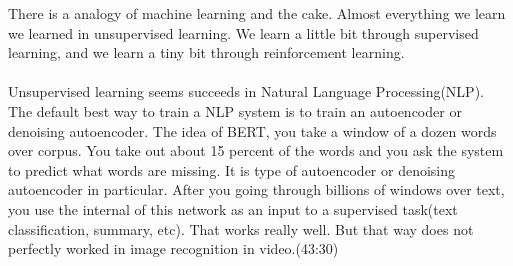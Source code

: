 \documentclass{article}
\begin{document}
There is a analogy of machine learning and the cake. Almost everything we learn we learned in unsupervised learning. We learn a little bit through supervised learning, and we learn a tiny bit through reinforcement learning. \\ \\

Unsupervised learning seems succeeds in Natural Language Processing(NLP). The default best way to train a NLP system is to train an autoencoder or denoising autoencoder. The idea of BERT, you take a window of a dozen words over corpus. You take out about 15 percent of the words and you ask the system to predict what words are missing. It is type of autoencoder or denoising autoencoder in particular. After you going through billions of windows over text, you use the internal of this network as an input to a supervised task(text classification, summary, etc). That works really well. But that way does not perfectly worked in image recognition in video.(43:30)
\end{document}
